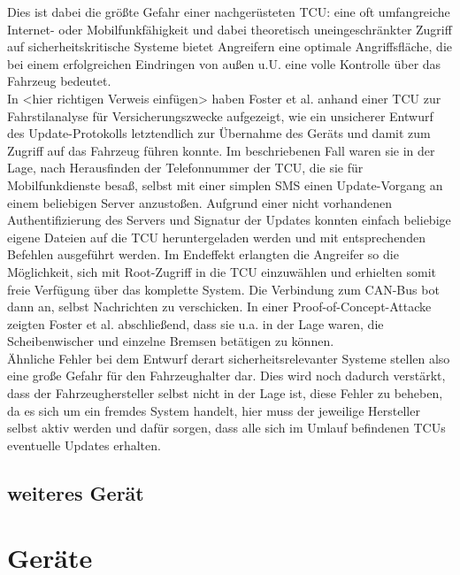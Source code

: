 \documentclass[
    fontsize=12pt,
    headings=small,
    parskip=half,           %
    bibliography=totoc,9
    numbers=noenddot,       %
    open=any,               %
    ]{scrreprt}
\begin{document}
Dies ist dabei die größte Gefahr einer nachgerüsteten TCU: eine oft umfangreiche Internet- oder Mobilfunkfähigkeit und dabei theoretisch uneingeschränkter Zugriff auf sicherheitskritische Systeme bietet Angreifern eine optimale Angriffsfläche, die bei einem erfolgreichen Eindringen von außen u.U. eine volle Kontrolle über das Fahrzeug bedeutet. \\
In <hier richtigen Verweis einfügen> haben Foster et al. anhand einer TCU zur Fahrstilanalyse für Versicherungszwecke aufgezeigt, wie ein unsicherer Entwurf des Update-Protokolls letztendlich zur Übernahme des Geräts und damit zum Zugriff auf das Fahrzeug führen konnte. Im beschriebenen Fall waren sie in der Lage, nach Herausfinden der Telefonnummer der TCU, die sie für Mobilfunkdienste besaß, selbst mit einer simplen SMS einen Update-Vorgang an einem beliebigen Server anzustoßen.
Aufgrund einer nicht vorhandenen Authentifizierung des Servers und Signatur der Updates konnten einfach beliebige eigene Dateien auf die TCU heruntergeladen werden und mit entsprechenden Befehlen ausgeführt werden. Im Endeffekt erlangten die Angreifer so die Möglichkeit, sich mit Root-Zugriff in die TCU einzuwählen und erhielten somit freie Verfügung über das komplette System. Die Verbindung zum CAN-Bus bot dann an, selbst Nachrichten zu verschicken. In einer Proof-of-Concept-Attacke zeigten Foster et al. abschließend, dass sie u.a. in der Lage waren, die Scheibenwischer und einzelne Bremsen betätigen zu können. \\
Ähnliche Fehler bei dem Entwurf derart sicherheitsrelevanter Systeme stellen also eine große Gefahr für den Fahrzeughalter dar. Dies wird noch dadurch verstärkt, dass der Fahrzeughersteller selbst nicht in der Lage ist, diese Fehler zu beheben, da es sich um ein fremdes System handelt, hier muss der jeweilige Hersteller selbst aktiv werden und dafür sorgen, dass alle sich im Umlauf befindenen TCUs eventuelle Updates erhalten.


\subsection{weiteres Gerät}


\section{Geräte}
\end{document}
